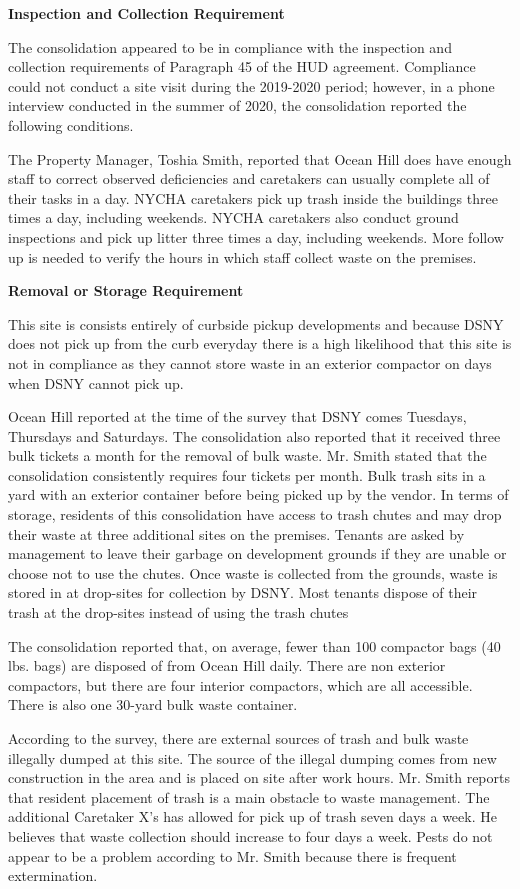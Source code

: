

\textbf{Inspection and Collection Requirement}

The consolidation appeared to be in compliance with the inspection and collection requirements of Paragraph 45 of the HUD agreement. Compliance could not conduct a site visit during the 2019-2020 period; however, in a phone interview conducted in the summer of 2020, the consolidation reported the following conditions.

The Property Manager, Toshia Smith, reported that Ocean Hill does have enough staff to correct observed deficiencies and caretakers can usually complete all of their tasks in a day. NYCHA caretakers pick up trash inside the buildings three times a day, including weekends. NYCHA caretakers also conduct ground inspections and pick up litter three times a day, including weekends. More follow up is needed to verify the hours in which staff collect waste on the premises.

\textbf{Removal or Storage Requirement}

This site is consists entirely of curbside pickup developments and because DSNY does not pick up from the curb everyday there is a high likelihood that this site is not in compliance as they cannot store waste in an exterior compactor on days when DSNY cannot pick up.

Ocean Hill reported at the time of the survey that DSNY comes Tuesdays, Thursdays and Saturdays. The consolidation also reported that it received three bulk tickets a month for the removal of bulk waste. Mr. Smith stated that the consolidation consistently requires four tickets per month. Bulk trash sits in a yard with an exterior container before being picked up by the vendor. In terms of storage, residents of this consolidation have access to trash chutes and may drop their waste at three additional sites on the premises. Tenants are asked by management to leave their garbage on development grounds if they are unable or choose not to use the chutes. Once waste is collected from the grounds, waste is stored in at drop-sites for collection by DSNY. Most tenants dispose of their trash at the drop-sites instead of using the trash chutes

The consolidation reported that, on average, fewer than 100 compactor bags (40 lbs. bags)  are disposed of from Ocean Hill daily. There are non exterior compactors, but there are four interior compactors, which are all accessible. There is also one 30-yard bulk waste container.

According to the survey, there are external sources of trash and bulk waste illegally dumped at this site. The source of the illegal dumping comes from new construction in the area and is placed on site after work hours. Mr. Smith reports that resident placement of trash is a main obstacle to waste management. The additional Caretaker X's has allowed for pick up of trash seven days a week. He believes that waste collection should increase to four days a week. Pests do not appear to be a problem according to Mr. Smith because there is frequent extermination.